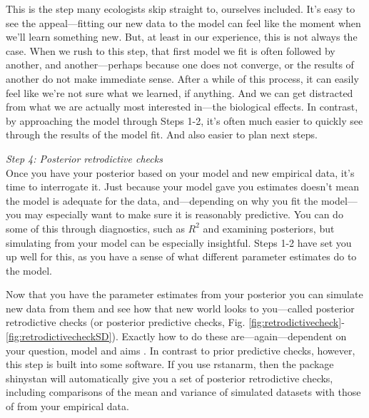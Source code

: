 \documentclass[11pt]{article}
\begin{document}
{This is the step many ecologists skip straight to, ourselves included. It's easy to see the appeal---fitting our new data to the model can feel like the moment when we'll learn something new. But, at least in our experience, this is not always the case. When we rush to this step, that first model we fit is often followed by another, and another---perhaps because one does not converge, or the results of another do not make immediate sense. After a while of this process, it can easily feel like we're not sure what we learned, if anything. And we can get distracted from what we are actually most interested in---the biological effects. In contrast, by approaching the model through Steps 1-2, it's often much easier to quickly see through the results of the model fit. And also easier to plan next steps. 
 

\emph{Step 4: Posterior retrodictive checks} \\
Once you have your posterior based on your model and new empirical data, it's time to interrogate it. Just because your model gave you estimates doesn't mean the model is adequate for the data, and---depending on why you fit the model---you may especially want to make sure it is reasonably predictive. You can do some of this through diagnostics, such as $R^2$ and examining posteriors, but simulating from your model can be especially insightful. Steps 1-2 have set you up well for this, as you have a sense of what different parameter estimates do to the model.

Now that you have the parameter estimates from your posterior you can simulate new data from them and see how that new world looks to you---called posterior retrodictive checks (or posterior predictive checks, Fig. \ref{fig:retrodictivecheck}-\ref{fig:retrodictivecheckSD}). Exactly how to do these are---again---dependent on your question, model and aims \citep[but there is lots written on this,][]{held2010,gelman200ppc,conn2018}. In contrast to prior predictive checks, however, this step is built into some software. If you use \textsf{rstanarm}, then the package \textsf{shinystan} will automatically give you a set of posterior retrodictive checks, including comparisons of the mean and variance of simulated datasets with those of from your empirical data. 

}
\end{document}
